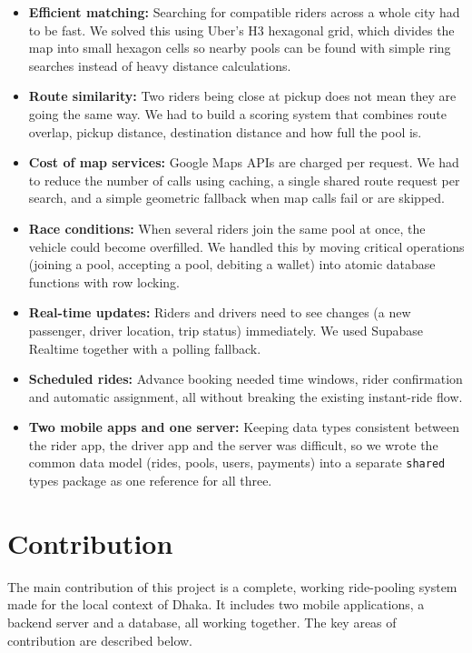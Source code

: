 \begin{itemize}
  \item \textbf{Efficient matching:} Searching for compatible riders across a
        whole city had to be fast. We solved this using Uber's H3 hexagonal
        grid, which divides the map into small hexagon cells so nearby pools
        can be found with simple ring searches instead of heavy distance
        calculations.
  \item \textbf{Route similarity:} Two riders being close at pickup does not
        mean they are going the same way. We had to build a scoring system that
        combines route overlap, pickup distance, destination distance and how
        full the pool is.
  \item \textbf{Cost of map services:} Google Maps APIs are charged per
        request. We had to reduce the number of calls using caching, a single
        shared route request per search, and a simple geometric fallback when
        map calls fail or are skipped.
  \item \textbf{Race conditions:} When several riders join the same pool at
        once, the vehicle could become overfilled. We handled this by moving
        critical operations (joining a pool, accepting a pool, debiting a
        wallet) into atomic database functions with row locking.
  \item \textbf{Real-time updates:} Riders and drivers need to see changes (a
        new passenger, driver location, trip status) immediately. We used
        Supabase Realtime together with a polling fallback.
  \item \textbf{Scheduled rides:} Advance booking needed time windows, rider
        confirmation and automatic assignment, all without breaking the
        existing instant-ride flow.
  \item \textbf{Two mobile apps and one server:} Keeping data types consistent
        between the rider app, the driver app and the server was difficult, so
        we wrote the common data model (rides, pools, users, payments) into a
        separate \texttt{shared} types package as one reference for all three.
\end{itemize}

\section{Contribution}
\label{sec:contribution}

The main contribution of this project is a complete, working ride-pooling
system made for the local context of Dhaka. It includes two mobile
applications, a backend server and a database, all working together. The key
areas of contribution are described below.

